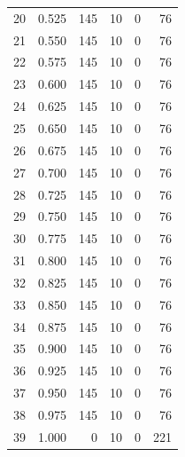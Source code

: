 \documentclass[a4paper,twoside,12pt]{book}
\begin{document}
\begin{appendices}
\begin{table}
\begin{tabular}{lrrrrr}
		20 &  0.525 &       145 &        10 &               0 &              76 \\
		21 &  0.550 &       145 &        10 &               0 &              76 \\
		22 &  0.575 &       145 &        10 &               0 &              76 \\
		23 &  0.600 &       145 &        10 &               0 &              76 \\
		24 &  0.625 &       145 &        10 &               0 &              76 \\
		25 &  0.650 &       145 &        10 &               0 &              76 \\
		26 &  0.675 &       145 &        10 &               0 &              76 \\
		27 &  0.700 &       145 &        10 &               0 &              76 \\
		28 &  0.725 &       145 &        10 &               0 &              76 \\
		29 &  0.750 &       145 &        10 &               0 &              76 \\
		30 &  0.775 &       145 &        10 &               0 &              76 \\
		31 &  0.800 &       145 &        10 &               0 &              76 \\
		32 &  0.825 &       145 &        10 &               0 &              76 \\
		33 &  0.850 &       145 &        10 &               0 &              76 \\
		34 &  0.875 &       145 &        10 &               0 &              76 \\
		35 &  0.900 &       145 &        10 &               0 &              76 \\
		36 &  0.925 &       145 &        10 &               0 &              76 \\
		37 &  0.950 &       145 &        10 &               0 &              76 \\
		38 &  0.975 &       145 &        10 &               0 &              76 \\
		39 &  1.000 &         0 &        10 &               0 &             221 \\
		\bottomrule
	\end{tabular}
\end{table}


\end{appendices}
\end{document}
